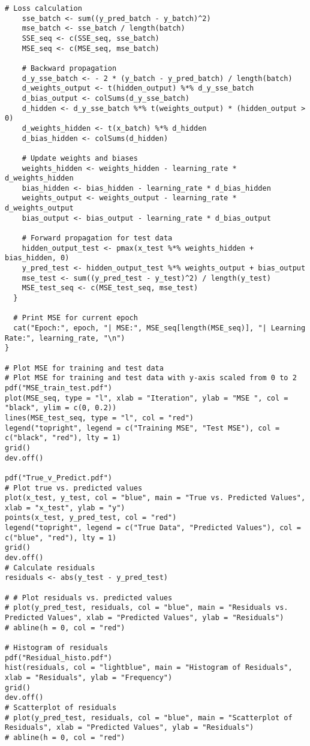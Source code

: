 \begin{tcolorbox}[colback=white!95!black,colframe=white!50!black,breakable]
\begin{lstlisting}[caption={Exercise 5b}, label={lst:sgd}]
    # Loss calculation
    sse_batch <- sum((y_pred_batch - y_batch)^2)
    mse_batch <- sse_batch / length(batch)
    SSE_seq <- c(SSE_seq, sse_batch)
    MSE_seq <- c(MSE_seq, mse_batch)
    
    # Backward propagation
    d_y_sse_batch <- - 2 * (y_batch - y_pred_batch) / length(batch)
    d_weights_output <- t(hidden_output) %*% d_y_sse_batch
    d_bias_output <- colSums(d_y_sse_batch)
    d_hidden <- d_y_sse_batch %*% t(weights_output) * (hidden_output > 0)
    d_weights_hidden <- t(x_batch) %*% d_hidden
    d_bias_hidden <- colSums(d_hidden)
    
    # Update weights and biases
    weights_hidden <- weights_hidden - learning_rate * d_weights_hidden
    bias_hidden <- bias_hidden - learning_rate * d_bias_hidden
    weights_output <- weights_output - learning_rate * d_weights_output
    bias_output <- bias_output - learning_rate * d_bias_output
    
    # Forward propagation for test data
    hidden_output_test <- pmax(x_test %*% weights_hidden + bias_hidden, 0)
    y_pred_test <- hidden_output_test %*% weights_output + bias_output
    mse_test <- sum((y_pred_test - y_test)^2) / length(y_test)
    MSE_test_seq <- c(MSE_test_seq, mse_test)
  }
  
  # Print MSE for current epoch
  cat("Epoch:", epoch, "| MSE:", MSE_seq[length(MSE_seq)], "| Learning Rate:", learning_rate, "\n")
}

# Plot MSE for training and test data
# Plot MSE for training and test data with y-axis scaled from 0 to 2
pdf("MSE_train_test.pdf")
plot(MSE_seq, type = "l", xlab = "Iteration", ylab = "MSE ", col = "black", ylim = c(0, 0.2))
lines(MSE_test_seq, type = "l", col = "red")
legend("topright", legend = c("Training MSE", "Test MSE"), col = c("black", "red"), lty = 1)
grid()
dev.off()

pdf("True_v_Predict.pdf")
# Plot true vs. predicted values
plot(x_test, y_test, col = "blue", main = "True vs. Predicted Values", xlab = "x_test", ylab = "y")
points(x_test, y_pred_test, col = "red")
legend("topright", legend = c("True Data", "Predicted Values"), col = c("blue", "red"), lty = 1)
grid()
dev.off()
# Calculate residuals
residuals <- abs(y_test - y_pred_test)

# # Plot residuals vs. predicted values
# plot(y_pred_test, residuals, col = "blue", main = "Residuals vs. Predicted Values", xlab = "Predicted Values", ylab = "Residuals")
# abline(h = 0, col = "red")

# Histogram of residuals
pdf("Residual_histo.pdf")
hist(residuals, col = "lightblue", main = "Histogram of Residuals", xlab = "Residuals", ylab = "Frequency")
grid()
dev.off()
# Scatterplot of residuals
# plot(y_pred_test, residuals, col = "blue", main = "Scatterplot of Residuals", xlab = "Predicted Values", ylab = "Residuals")
# abline(h = 0, col = "red")
\end{lstlisting}
\end{tcolorbox}